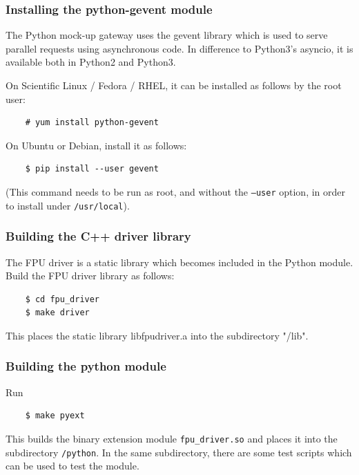 \documentclass[11pt,a4paper]{scrartcl}
\begin{document}
\subsubsection{Installing the python-gevent module}
The Python mock-up gateway uses the gevent
library which is used to serve parallel requests
using asynchronous code. In difference to
Python3's asyncio, it is available both in
Python2 and Python3.

On Scientific Linux / Fedora / RHEL, it can be installed
as follows by the root user:

  \begin{verbatim}
    # yum install python-gevent
  \end{verbatim}    


On Ubuntu or Debian, install it as follows:

  \begin{verbatim}
    $ pip install --user gevent
  \end{verbatim}    

(This command needs to be run as root, and without the \texttt{--user}
  option, in order to install under \texttt{/usr/local}).



\subsubsection{Building the C++ driver library}
The FPU driver is a static library which becomes included in the
Python module.  Build the FPU driver library as follows:

  \begin{verbatim}
    $ cd fpu_driver
    $ make driver
  \end{verbatim}    

This places the static library libfpudriver.a into
the subdirectory "/lib".

\subsubsection{Building the python module}

Run

  \begin{verbatim}
    $ make pyext
  \end{verbatim}    

This builds the binary extension module \verb+fpu_driver.so+
and places it into the subdirectory \verb+/python+.
In the same subdirectory, there are some test
scripts which can be used to test the module.
\end{document}
